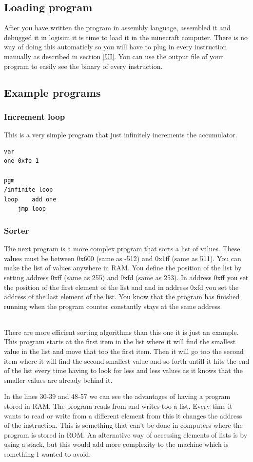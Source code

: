\documentclass{article}
\begin{document}
\subsection{Loading program\label{Loading in}}
After you have written the program in assembly language, assembled it and debugged it in logisim it is time to load it in the minecraft computer. There is no way of doing this automaticly so you will have to plug in every instruction manually as described in section \ref{UI}. You can use the output file of your program to easily see the binary of every instruction.
\subsection{Example programs}
\subsubsection{Increment loop}
This is a very simple program that just infinitely increments the accumulator.
\begin{lstlisting}
var
one 0xfe 1

pgm
/infinite loop
loop	add one
	jmp loop
\end{lstlisting}
\subsubsection{Sorter\label{Round}}
The next program is a more complex program that sorts a list of values. These values must be between 0x600 (same as -512) and 0x1ff (same as 511). You can make the list of values anywhere in RAM. You define the position of the list by setting address 0xff (same as 255) and 0xfd (same as 253). In address 0xff you set the position of the first element of the list and and in address 0xfd you set the address of the last element of the list. You know that the program has finished running when the program counter constantly stays at the same address.

~\\
There are more efficient sorting algorithms than this one it is just an example. This program starts at the first item in the list where it will find the smallest value in the list and move that too the first item. Then it will go too the second item where it will find the second smallest value and so forth untill it hits the end of the list every time having to look for less and less values as it knows that the smaller values are already behind it.

In the lines 30-39 and 48-57 we can see the advantages of having a program stored in RAM. The program reads from and writes too a list. Every time it wants to read or write from a different element from this it changes the address of the instruction. This is something that can't be done in computers where the program is stored in ROM. An alternative way of accessing elements of lists is by using a stack, but this would add more complexity to the machine which is something I wanted to avoid.
\end{document}
